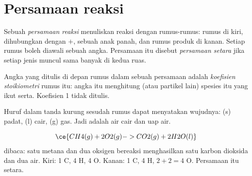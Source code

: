 \section{Persamaan reaksi}

\begin{definition}\label{def:g8:balanced-equations:equation}
Sebuah \emph{persamaan reaksi} menuliskan reaksi
dengan rumus-rumus: rumus  di kiri, dihubungkan dengan $+$,
sebuah anak panah, dan rumus produk di kanan. Setiap rumus boleh
diawali sebuah angka. Persamaan itu disebut
\emph{persamaan setara} jika setiap jenis 
muncul sama banyak di kedua ruas.
\end{definition}

\begin{definition}\label{def:g8:balanced-equations:coefficient}
Angka yang ditulis di depan rumus dalam sebuah persamaan adalah
\emph{koefisien stoikiometri} rumus itu:
angka itu menghitung  (atau partikel lain) spesies itu yang ikut
serta. Koefisien 1 tidak ditulis.
\end{definition}

\begin{notation}\label{not:g8:balanced-equations:states}
Huruf dalam tanda kurung sesudah rumus dapat menyatakan wujudnya: (s)
padat, (l) cair, (g) gas. Jadi  adalah air cair dan
 uap air.
\end{notation}

\begin{example}\label{ex:g8:balanced-equations:read}
\[
  \ce{CH4(g) + 2O2(g) -> CO2(g) + 2H2O(l)}
\]
dibaca: satu  metana dan dua  oksigen bereaksi
menghasilkan satu  karbon dioksida dan dua  air. Kiri:
1 C, 4 H, 4 O. Kanan: 1 C, 4 H, $2 + 2 = 4$ O. Persamaan itu setara.
\end{example}

